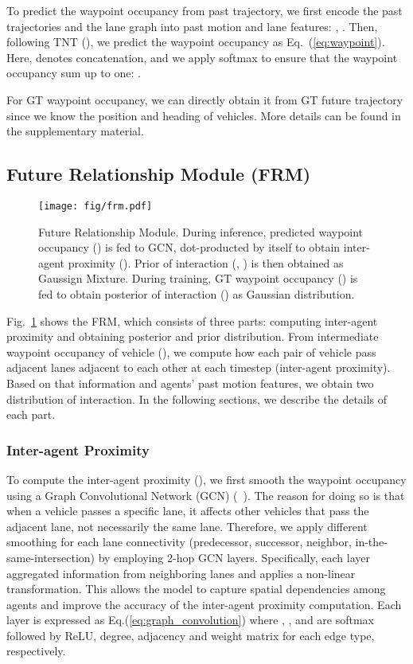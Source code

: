 \documentclass{article} \usepackage{iclr2023_conference,times}
\begin{document}
To predict the waypoint occupancy from past trajectory, we first encode the past trajectories  and the lane graph  into past motion and lane features: , . 
Then, following TNT (\cite{zhao2021tnt}), we predict the waypoint occupancy as Eq.~(\ref{eq:waypoint}). Here,  denotes concatenation, and we apply softmax to ensure that the waypoint occupancy sum up to one: . 

For GT waypoint occupancy, we can directly obtain it from GT future trajectory since we know the position and heading of vehicles.
More details can be found in the supplementary material. 

\subsection{Future Relationship Module (FRM)}
\label{sec:fri_module}
\begin{figure}
  \centering
  \hspace*{-0.0\linewidth}\texttt{[image: fig/frm.pdf]}
  \caption{Future Relationship Module. During inference, predicted waypoint occupancy () is fed to GCN, dot-producted by itself to obtain inter-agent proximity (). Prior of interaction (, ) is then obtained as Gaussign Mixture. During training, GT waypoint occupancy () is fed to obtain posterior of interaction () as Gaussian distribution.}  
  \label{fig:fpi_module}
  \vspace{-3pt}
\end{figure}

Fig.~\ref{fig:fpi_module} shows the FRM, which consists of three parts: computing inter-agent proximity and obtaining posterior and prior distribution.
From intermediate waypoint occupancy of vehicle (), we compute how each pair of vehicle pass adjacent lanes adjacent to each other at each timestep (inter-agent proximity). 
Based on that information and agents' past motion features, we obtain two distribution of interaction.
In the following sections, we describe the details of each part.

\subsubsection{Inter-agent Proximity}

To compute the inter-agent proximity (), we first smooth the waypoint occupancy using a Graph Convolutional Network (GCN) (~\cite{welling2016semi}).
The reason for doing so is that when a vehicle passes a specific lane, it affects other vehicles that pass the adjacent lane, not necessarily the same lane.
Therefore, we apply different smoothing for each lane connectivity (predecessor, successor, neighbor, in-the-same-intersection) by employing 2-hop GCN layers.
Specifically, each layer aggregated information from neighboring lanes and applies a non-linear transformation.
This allows the model to capture spatial dependencies among agents and improve the accuracy of the inter-agent proximity computation.
Each layer is expressed as Eq.(\ref{eq:graph_convolution}) where , ,  and  are softmax followed by ReLU, degree, adjacency and weight matrix for each edge type, respectively.
\end{document}
